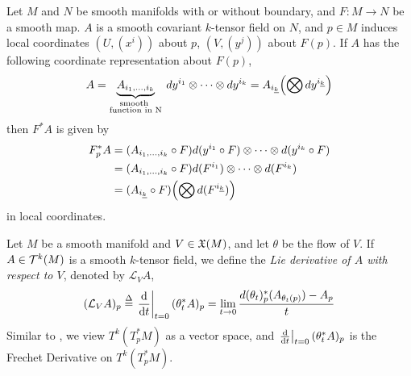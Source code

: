\documentclass[../main-manifolds.tex]{subfiles}
\begin{document}
\begin{wts}\label{tensor-field-pullback-coordinates}
    Let $M$ and $N$ be smooth manifolds with or without boundary, and $F:M\to N$ be a smooth map. $A$ is a smooth covariant $k$-tensor field on $N$, and $p\in M$ induces local coordinates $(U,(x^i))$ about $p$, $(V,(y^j))$ about $F(p)$. If $A$ has the following coordinate representation about $F(p)$,
    \begin{equation}\label{tensor-field-pullback-coordinates-eq0}
        A = \underbrace{A_{i_1,\ldots,i_k}}_{\substack{\text{smooth }\\ \text{function in N}}} \: dy^{i_1}\otimes\cdots\otimes dy^{i_k} = A_{\Ul{i}[k]}\qty(\bigotimes dy^{\Ul{i}[k]})
    \end{equation}
    then $F^*A$ is given by
    \begin{align}\label{tensor-field-pullback-coordinates-eq1}
        F^*_pA &= (A_{i_1,\ldots,i_k}\circ F)d(y^{i_1}\circ F)\otimes \cdots\otimes d(y^{i_k}\circ F)\\
        &= (A_{i_1,\ldots,i_k}\circ F)d(F^{i_1})\otimes \cdots\otimes d(F^{i_k})\\
        &= (A_{\Ul{i}[k]}\circ F)\qty(\bigotimes d(F^{\Ul{i}[k]}))
    \end{align}
    in local coordinates.
\end{wts}

\begin{definition}
    Let $M$ be a smooth manifold and $V\in\mathfrak{X}(M)$, and let $\theta$ be the flow of $V$. If $A\in \mathcal{T}^k(M)$ is a smooth $k$-tensor field, we define the \emph{Lie derivative of $A$ with respect to $V$}, denoted by $\mathcal{L}_V A$, 
    \begin{equation}\label{lie-derivative-eq1-tensor}
        (\mathcal{L}_VA)_p \defined\eval{\dv{t}}_{t=0}(\theta^*_tA)_p = \lim_{t\to 0}\dfrac{d(\theta_t)^*_p(A_{\theta_t(p)}) - A_p}{t}
    \end{equation}
    Similar to , we view $T^k(T^*_pM)$ as a vector space, and $\eval{\dv{t}}_{t=0}(\theta_t^*A)_p$ is the Frechet Derivative on $T^k(T^*_pM)$.
\end{definition}
\end{document}
